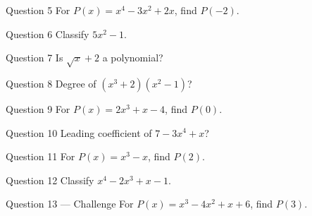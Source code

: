 \documentclass[11pt]{article}
\begin{document}
\begin{qbox}{Question 5}
For $P(x)=x^4-3x^2+2x$, find $P(-2)$.\workspace{2.4cm}
\end{qbox}

\begin{qbox}{Question 6}
Classify $5x^2-1$.\workspace{2.4cm}
\end{qbox}

\begin{qbox}{Question 7}
Is $\sqrt{x}+2$ a polynomial?\workspace{2.4cm}
\end{qbox}

\begin{qbox}{Question 8}
Degree of $(x^3+2)(x^2-1)$?\workspace{2.4cm}
\end{qbox}

\begin{qbox}{Question 9}
For $P(x)=2x^3+x-4$, find $P(0)$.\workspace{2.4cm}
\end{qbox}

\begin{qbox}{Question 10}
Leading coefficient of $7-3x^4+x$?\workspace{2.4cm}
\end{qbox}

\begin{qbox}{Question 11}
For $P(x)=x^3-x$, find $P(2)$.\workspace{2.4cm}
\end{qbox}

\begin{qbox}{Question 12}
Classify $x^4-2x^3+x-1$.\workspace{2.4cm}
\end{qbox}

\begin{qbox}{Question 13 --- Challenge}
For $P(x)=x^3-4x^2+x+6$, find $P(3)$.\workspace{3cm}
\end{qbox}

\clearpage
{}
\end{document}
